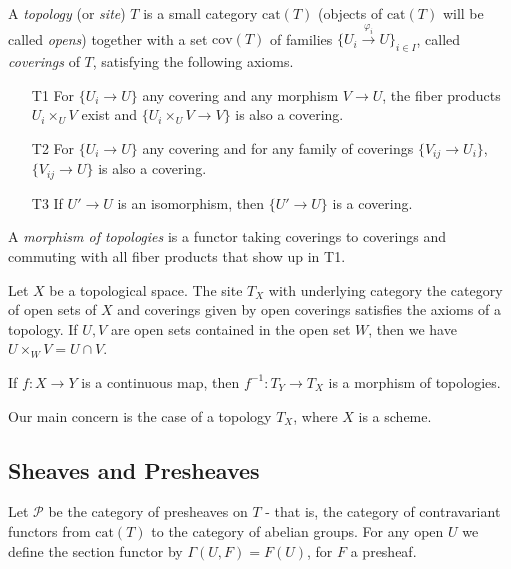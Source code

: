 \begin{defn} A \emph{topology} (or \emph{site}) $T$ is a small category $\mbox{cat}(T)$ (objects of $\mbox{cat}(T)$ will be called \emph{opens}) together with a set $\mbox{cov}(T)$ of families $\{U_i \stackrel{\varphi_i}{\rightarrow} U\}_{i\in I}$, called \emph{coverings} of $T$, satisfying the following axioms.
\begin{itemize}
\item[T1] For $\{U_i \rightarrow U\}$ any covering and any morphism $V\rightarrow U$, the fiber products $U_i \times_U V$ exist and $\{U_i \times_U V \rightarrow V\}$ is also a covering.

\item[T2] For $\{U_i \rightarrow U\}$ any covering and for any family of coverings $\{V_{ij} \rightarrow U_i\}$, $\{V_{ij} \rightarrow U\}$ is also a covering.

\item[T3] If $U' \rightarrow U$ is an isomorphism, then $\{U' \rightarrow U\}$ is a covering.
\end{itemize}

A \emph{morphism of topologies} is a functor taking coverings to coverings and commuting with all fiber products that show up in T1.
\end{defn}

\begin{ex} Let $X$ be a topological space. The site $T_X$ with underlying category the category of open sets of $X$ and coverings given by open coverings satisfies the axioms of a topology. If $U,V$ are open sets contained in the open set $W$, then we have $U\times_W V = U\cap V$.

If $f:X\rightarrow Y$ is a continuous map, then $f^{-1} : T_Y \rightarrow T_X$ is a morphism of topologies.
\end{ex}

Our main concern is the case of a topology $T_X$, where $X$ is a scheme.

\subsection{Sheaves and Presheaves}

Let $\mathcal{P}$ be the category of presheaves on $T$ - that is, the category of contravariant functors from $\mbox{cat}(T)$ to the category of abelian groups. For any open $U$ we define the section functor by $\Gamma(U,F) = F(U)$, for $F$ a presheaf.

